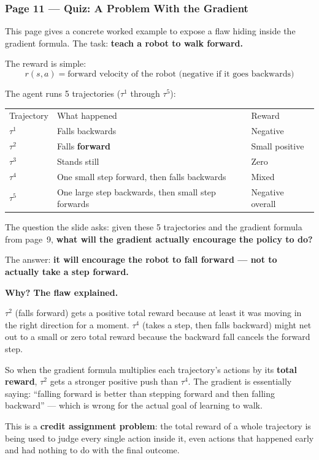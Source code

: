 \subsubsection*{Page 11 --- Quiz: A Problem With the Gradient}

This page gives a concrete worked example to expose a flaw hiding inside the gradient formula.
The task: \textbf{teach a robot to walk forward.}

The reward is simple:
\[
  r(s,a) = \text{forward velocity of the robot (negative if it goes backwards)}
\]

The agent runs 5 trajectories ($\tau^1$ through $\tau^5$):

\begin{tabular}{lll}
  Trajectory & What happened & Reward \\[4pt]
  $\tau^1$ & Falls backwards & Negative \\
  $\tau^2$ & Falls \textbf{forward} & Small positive \\
  $\tau^3$ & Stands still & Zero \\
  $\tau^4$ & One small step forward, then falls backwards & Mixed \\
  $\tau^5$ & One large step backwards, then small step forwards & Negative overall \\
\end{tabular}

\medskip
The question the slide asks: given these 5 trajectories and the gradient formula from page~9,
\textbf{what will the gradient actually encourage the policy to do?}

The answer: \textbf{it will encourage the robot to fall forward --- not to actually take a
step forward.}

\medskip
\textbf{Why? The flaw explained.}

$\tau^2$ (falls forward) gets a positive total reward because at least it was moving in the
right direction for a moment. $\tau^4$ (takes a step, then falls backward) might net out to a
small or zero total reward because the backward fall cancels the forward step.

So when the gradient formula multiplies each trajectory's actions by its \textbf{total reward},
$\tau^2$ gets a stronger positive push than $\tau^4$. The gradient is essentially saying:
``falling forward is better than stepping forward and then falling backward'' --- which is
wrong for the actual goal of learning to walk.

This is a \textbf{credit assignment problem}: the total reward of a whole trajectory is being
used to judge every single action inside it, even actions that happened early and had nothing
to do with the final outcome.

